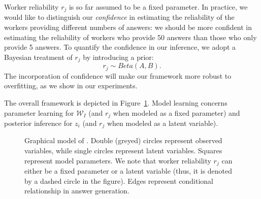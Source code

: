 Worker reliability $r_j$ is so far assumed to be a fixed parameter. In practice, we would like to distinguish our \emph{confidence} in estimating the reliability of the workers providing different numbers of answers: we should be more confident in estimating the reliability of workers who provide 50 answers than those who only provide 5 answers. To quantify the confidence in our inference, we adopt a Bayesian treatment of $r_j$ by introducing a prior:
%
\begin{equation}
        r_j \sim Beta(A,B).
        \label{eq:rj_dist}
\end{equation}
%
The incorporation of confidence will make our framework more robust to overfitting, as we show in our experiments. 

The overall \sys framework is depicted in Figure~\ref{fig:graphical_model}. Model learning concerns parameter learning for $\mathcal{W}_I$ (and $r_j$ when modeled as a fixed parameter) and posterior inference for $z_i$ (and $r_j$ when modeled as a latent variable).  

\begin{figure}[htb] 
{
}
\caption{Graphical model  of \sys. Double (greyed) circles represent observed variables, while single circles represent latent variables.  Squares represent model parameters. We note that worker reliability $r_j$ can either be a fixed parameter or a latent variable (thus, it is denoted by a dashed circle in the figure). Edges represent conditional relationship in answer generation.}
\label{fig:graphical_model}
\end{figure}


